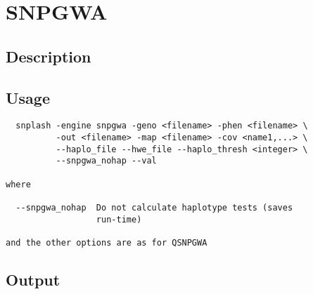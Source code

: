 \section{SNPGWA}
\label{sec:snpgwa}
\subsection{Description}

\subsection{Usage}
\begin{verbatim}
  snplash -engine snpgwa -geno <filename> -phen <filename> \
          -out <filename> -map <filename> -cov <name1,...> \
          --haplo_file --hwe_file --haplo_thresh <integer> \
          --snpgwa_nohap --val

where

  --snpgwa_nohap  Do not calculate haplotype tests (saves
                  run-time)

and the other options are as for QSNPGWA
\end{verbatim}

\subsection{Output}

